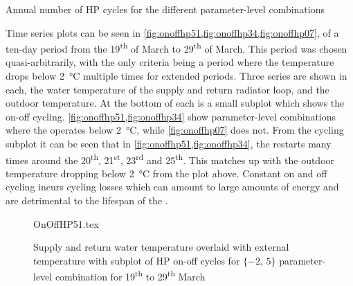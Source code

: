 \begin{table}[htb]
    \footnotesize
    \centering
    \caption{Annual number of \acs{HP} cycles for the different parameter-level combinations}
    \label{tbl:cycling}
\end{table}

Time series plots can be seen in \cref{fig:onoffhp51,fig:onoffhp34,fig:onoffhp07}, of a ten-day period from the 19\textsuperscript{th} of March to 29\textsuperscript{th} of March. This period was chosen quasi-arbitrarily, with the only criteria being a period where the temperature drops below \qty{2}{\celsius} multiple times for extended periods. Three series are shown in each, the water temperature of the supply and return radiator loop, and the outdoor temperature. At the bottom of each is a small subplot which shows the \HP on-off cycling. \cref{fig:onoffhp51,fig:onoffhp34} show parameter-level combinations where the \HP operates below \qty{2}{\celsius}, while \cref{fig:onoffhp07} does not. From the cycling subplot it can be seen that in \cref{fig:onoffhp51,fig:onoffhp34}, the \HP restarts many times around the 20\textsuperscript{th}, 21\textsuperscript{st}, 23\textsuperscript{rd} and 25\textsuperscript{th}. This matches up with the outdoor temperature dropping below \qty{2}{\celsius} from the plot above. Constant on and off cycling incurs cycling losses which can amount to large amounts of energy and are detrimental to the lifespan of the \HP \cite{bagarella_cycling_2013,dongellini_-off_2019}.
\begin{figure}[h!]
    \centering
    {OnOffHP51.tex}
    \vspace*{-1.8\baselineskip}
    \caption[Supply and return water temperature, outdoor temperature and \acs{HP} on/off cycling for $\{-2\text{, }5\}$]{Supply and return water temperature overlaid with external temperature with subplot of \acs{HP} on-off cycles for $\{-2\text{, }5\}$ parameter-level combination for 19\textsuperscript{th} to 29\textsuperscript{th} March}
    \label{fig:onoffhp51}
\end{figure}


